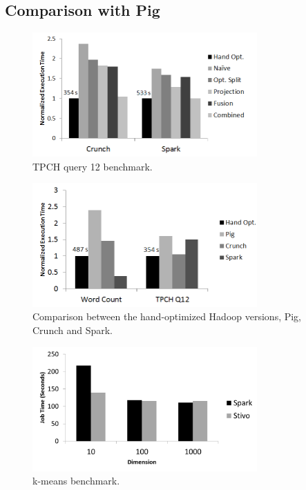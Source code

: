 \subsection{Comparison with Pig}
\label{subsec:pig}
\begin{figure}[t]
    \includegraphics[width=8.6cm]{figures/tpch.png}
   \caption{TPCH query 12 benchmark.}
  \label{fig:tpch}%
\end{figure}
\begin{figure}[t]
    \includegraphics[width=8.6cm]{figures/pig.png}
   \caption{Comparison between the hand-optimized Hadoop versions, Pig, Crunch
   and Spark.}
   \label{fig:pig}%
\end{figure}

\begin{figure}[t]
    \includegraphics[width=8.6cm]{figures/k-means}
   \caption{k-means benchmark.}
   \label{fig:k-means}%
\end{figure}

